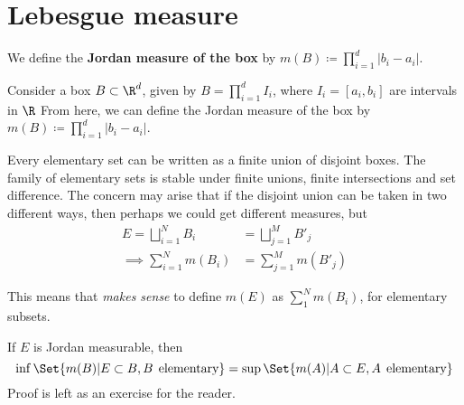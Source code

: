 \documentclass{article}
\newcommand{\1}[1]{\mathbbm{1}_{#1}}
\begin{document}
\clearpage
\section{Lebesgue measure}

\begin{defi}
    We define the \textbf{Jordan measure of the box} by $m(B) \coloneqq \prod_{i=1}^d |b_i - a_i|$.
\end{defi}
Consider a box $B \subset \R^d$, given by $B = \prod_{i=1}^d I_i$, where $I_i = [a_i, b_i]$ are intervals in $\R$
From here, we can define the Jordan measure of the box by $m(B) \coloneqq \prod_{i=1}^d |b_i - a_i|$.


\begin{remark}
    Every elementary set can be written as a finite union of disjoint boxes.
    The family of elementary sets is stable under finite unions, finite intersections and set difference.
    The concern may arise that if the disjoint union can be taken in two different ways, then perhaps we could get different measures, but
    \begin{align*}
        E = \bigsqcup_{i=1}^N B_i &= \bigsqcup_{j=1}^M B'_j \\
        \implies \sum_{i=1}^N m(B_i) &= \sum_{j=1}^M m(B'_j)
    \end{align*}

    This means that \emph{makes sense} to define $m(E)$ as $\sum_1^N m(B_i)$, for elementary subsets.
\end{remark}


\begin{remark}
    If $E$ is Jordan measurable, then
    \begin{equation*}
        \inf\Set{m(B)| E \subset B, B \,\; \text{elementary}} = \sup\Set{m(A)| A \subset E, A \;\, \text{elementary}}
    \end{equation*}
    Proof is left as an exercise for the reader.
\end{remark}
\end{document}

